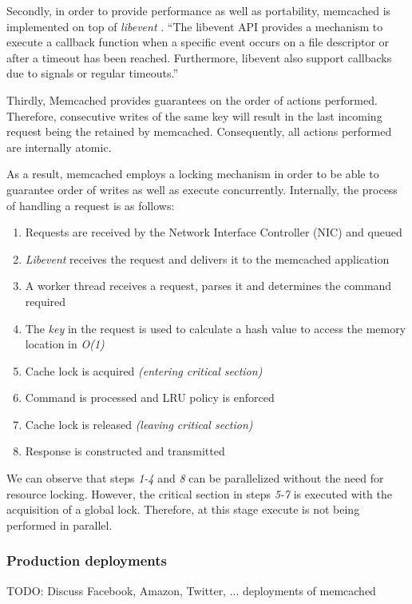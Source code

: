 Secondly, in order to provide performance as well as  portability, memcached is implemented on top of \textit{libevent} \cite{libevent}. ``The libevent API provides a mechanism to execute a callback function when a specific event occurs on a file descriptor or after a timeout has been reached. Furthermore, libevent also support callbacks due to signals or regular timeouts.'' \cite{libevent}

Thirdly, Memcached provides guarantees on the order of actions performed. Therefore, consecutive writes of the same key will result in the last incoming request being the retained by memcached. Consequently, all actions performed are internally atomic.

As a result, memcached employs a locking mechanism in order to be able to guarantee order of writes as well as execute concurrently. Internally, the process of handling a request is as follows:

\begin{enumerate}
    \item Requests are received by the Network Interface Controller (NIC) and queued
    \item \emph{Libevent} receives the request and delivers it to the memcached application
    \item A worker thread receives a request, parses it and determines the command required
    \item The \emph{key} in the request is used to calculate a hash value to access the memory location in \emph{O(1)}
    \item Cache lock is acquired \emph{(entering critical section)}
    \item Command is processed and LRU policy is enforced
    \item Cache lock is released \emph{(leaving critical section)}
    \item Response is constructed and transmitted \cite{wiggins2012enhancing}
\end{enumerate}

We can observe that steps \textit{1-4} and \textit{8} can be parallelized without the need for resource locking. However, the critical section in steps \textit{5-7} is executed with the acquisition of a global lock. Therefore, at this stage execute is not being performed in parallel.


\subsubsection{Production deployments}
TODO: Discuss Facebook, Amazon, Twitter, ... deployments of memcached


